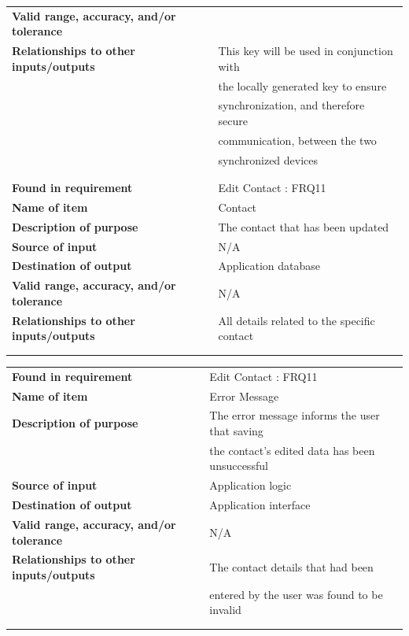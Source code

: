 \begin{tabular}{ll}
\textbf{Valid range, accuracy, and/or tolerance}&\\
\textbf{Relationships to other inputs/outputs}&This key will be used in conjunction with\\& the locally generated key to ensure\\& synchronization, and therefore secure\\& communication, between the two \\&synchronized devices\\
&\\
&\\
\textbf{Found in requirement}&Edit Contact : FRQ11\\
\textbf{Name of item}&Contact\\
\textbf{Description of purpose}&The contact that has been updated\\
\textbf{Source of input}&N/A\\
\textbf{Destination of output}&Application database\\
\textbf{Valid range, accuracy, and/or tolerance}&N/A\\
\textbf{Relationships to other inputs/outputs}&All details related to the specific contact\\
&\\
&\\
\end{tabular}
\newpage
\begin{tabular}{ll}
\textbf{Found in requirement}&Edit Contact : FRQ11\\
\textbf{Name of item}&Error Message\\
\textbf{Description of purpose}&The error message informs the user that saving\\& the contact's edited data has been unsuccessful\\
\textbf{Source of input}&Application logic\\
\textbf{Destination of output}&Application interface\\
\textbf{Valid range, accuracy, and/or tolerance}&N/A\\
\textbf{Relationships to other inputs/outputs}&The contact details that had been\\& entered by the user was found to be invalid\\
&\\
&\\
\end{tabular}

